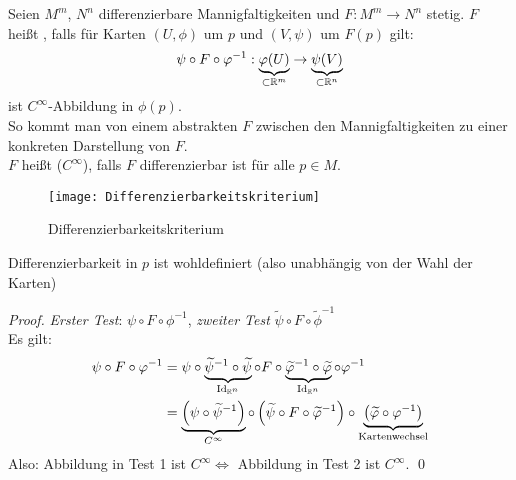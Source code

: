 \begin{definition}[Differenzierbarkeit]
  Seien \( M^m \), \( N^n \) differenzierbare Mannigfaltigkeiten und \( F: M^m \to N^n \) stetig. \( F \) heißt \label{def:differenzierbar}, falls für Karten \( (U, \phi) \) um \( p \) und \( (V, \psi) \) um \( F(p) \) gilt:
  \begin{equation*}
    \psi \circ F \circ \varphi^{-1}: \underbrace{\varphi(U)}_{\subset \mathbb{R}^m} \to \underbrace{\psi(V)}_{\subset \mathbb{R}^n}
  \end{equation*}
  ist \( C^\infty \)-Abbildung in \( \phi(p) \). \\
  So kommt man von einem abstrakten \( F \) zwischen den Mannigfaltigkeiten zu einer konkreten Darstellung von \( F \). \\
  \( F \) heißt  (\( C^\infty \)), falls \( F \) differenzierbar ist für alle \( p \in M \).
  \begin{figure}[H]
    \texttt{[image: Differenzierbarkeitskriterium]}
    \caption{Differenzierbarkeitskriterium}
  \end{figure}
\end{definition}

\begin{remark}
  Differenzierbarkeit in \( p \) ist wohldefiniert (also unabhängig von der Wahl der Karten)
  \begin{proof}
    \emph{Erster Test}: \( \psi \circ F \circ \phi^{-1} \), \emph{zweiter Test} \( \widetilde{\psi} \circ F \circ \widetilde{\phi}^{-1} \) \\
    Es gilt:
    \begin{align*}
      \psi \circ F \circ \varphi^{-1} &= \psi \circ \underbrace{\widetilde{\psi}^{-1} \circ \widetilde{\psi}}_{\text{Id}_{\mathbb{R}^n}} \circ F \circ \underbrace{\widetilde{\varphi}^{-1} \circ \widetilde{\varphi}}_{\text{Id}_{\mathbb{R}^n}} \circ \varphi^{-1} \\
        &= \underbrace{\left( \psi \circ \widetilde{\psi}^{-1} \right)}_{C^\infty} \circ \left( \widetilde{\psi} \circ F \circ \widetilde{\varphi}^{-1} \right) \circ \underbrace{\left( \widetilde{\varphi} \circ \varphi^{-1} \right)}_{\text{Kartenwechsel}}
    \end{align*}
    Also: Abbildung in Test 1 ist \( C^\infty \Leftrightarrow \) Abbildung in Test 2 ist \( C^\infty \). \qed{}
  \end{proof}
\end{remark}

